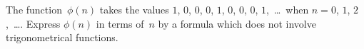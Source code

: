The function~$\phi(n)$ takes the values $1$, $0$, $0$, $0$, $1$, $0$, $0$, $0$, $1$,~\dots\ when
$n = 0$, $1$, $2$,~\dots. Express $\phi(n)$ in terms of~$n$ by a formula which does not
involve trigonometrical functions. 

